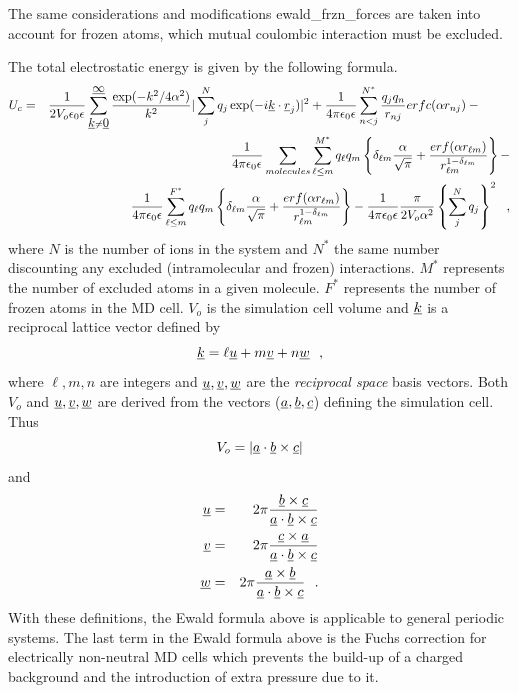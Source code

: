 The same considerations and modifications {\sc
ewald\_frzn\_forces} are taken into account for frozen atoms,
which mutual coulombic interaction must be excluded.

The total electrostatic energy is given by the following formula.
\begin{eqnarray}
U_{c}&=&\frac{1}{2V_{o} \epsilon_{0}\epsilon} \sum_{\mbox{$\underline{k}$} \neq
\mbox{$\underline{0}$}}^{\mbox{$\underline{\infty}$}} \frac{\exp(-k^{2}/4\alpha^{2})}{k^{2}}
|\sum_{j}^{N} q_{j}\exp(-i\mbox{$\underline{k}$}\cdot\mbox{$\underline{r}$}_{j})|^{2} +
\frac{1}{4\pi\epsilon_{0}\epsilon} \sum_{n<j}^{N^{*}} \frac{q_{j}q_{n}}
{r_{nj}} erfc(\alpha r_{nj}) - \phantom{xxxx} \nonumber \\
& & \frac{1}{4\pi\epsilon_{0}\epsilon} \sum_{molecules}
\sum_{\ell\le m}^{M^{*}} q_{\ell}q_{m} \left\{ \delta_{\ell m}
\frac{\alpha}{\sqrt{\pi}} + \frac{erf(\alpha r_{\ell m})}{r_{\ell
m}^{1-\delta_{\ell m}}} \right\} - \\
& & \frac{1}{4\pi\epsilon_{0}\epsilon} \sum_{\ell\le m}^{F^{*}}
q_{\ell}q_{m} \left\{ \delta_{\ell m} \frac{\alpha}{\sqrt{\pi}} +
\frac{erf(\alpha r_{\ell m})}{r_{\ell m}^{1-\delta_{\ell m}}}
\right\} - \frac{1}{4\pi\epsilon_{0}\epsilon} \frac{\pi}{2V_{o} \alpha^{2}}
\left\{ \sum_{j}^{N} q_{j} \right\}^{2}~~, \nonumber
\end{eqnarray}
where $N$ is the number of ions in the system and $N^{*}$ the same
number discounting any excluded (intramolecular and frozen)
interactions.  $M^{*}$ represents the number of excluded atoms in
a given molecule.  $F^{*}$ represents the number of frozen atoms
in the MD cell.  $V_{o}$ is the simulation cell volume and
$\mbox{$\underline{k}$}$ is a reciprocal lattice vector defined by
\begin{equation}
\mbox{$\underline{k}$} = \ell \mbox{$\underline{u}$} + m \mbox{$\underline{v}$} + n \mbox{$\underline{w}$} \label{k-vector}~~,
\end{equation}
where $\ell,m,n$ are integers and $\mbox{$\underline{u}$},\mbox{$\underline{v}$},\mbox{$\underline{w}$}$ are
the {\em reciprocal space} basis vectors.  Both $V_{o}$ and
$\mbox{$\underline{u}$},\mbox{$\underline{v}$},\mbox{$\underline{w}$}$ are derived from the vectors
($\mbox{$\underline{a}$},\mbox{$\underline{b}$},\mbox{$\underline{c}$}$) defining the simulation cell.  Thus
\begin{equation}
V_{o} = |\mbox{$\underline{a}$} \cdot \mbox{$\underline{b}$} \times \mbox{$\underline{c}$}|
\end{equation}
and
\begin{eqnarray}
\mbox{$\underline{u}$} &=& 2 \pi \frac{\mbox{$\underline{b}$} \times \mbox{$\underline{c}$}}{\mbox{$\underline{a}$} \cdot \mbox{$\underline{b}$} \times \mbox{$\underline{c}$}} \nonumber \\
\mbox{$\underline{v}$} &=& 2 \pi \frac{\mbox{$\underline{c}$} \times \mbox{$\underline{a}$}}{\mbox{$\underline{a}$} \cdot \mbox{$\underline{b}$} \times\mbox{$\underline{c}$}} \\
\mbox{$\underline{w}$} &=& 2 \pi \frac{\mbox{$\underline{a}$} \times \mbox{$\underline{b}$}}{\mbox{$\underline{a}$} \cdot \mbox{$\underline{b}$} \times \mbox{$\underline{c}$}}~~. \nonumber
\end{eqnarray}
With these definitions, the Ewald formula above is applicable to
general periodic systems.  The last term in the Ewald formula above
is the Fuchs correction \cite{fuchs-35a} for electrically
non-neutral MD cells which prevents the build-up of a charged
background and the introduction of extra pressure due to it.

